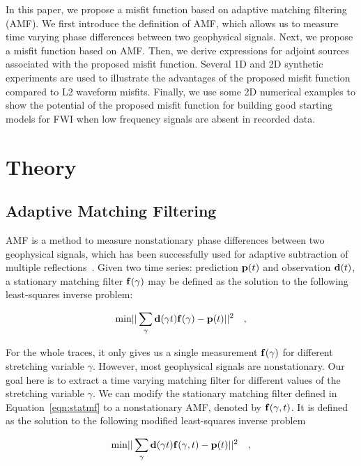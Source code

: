 In this paper, we propose a misfit function based on adaptive matching filtering (AMF). 
We first introduce the definition of AMF, which allows us to measure 
time varying phase differences between two geophysical signals. 
Next, we propose a misfit function based on AMF. Then, we derive expressions for adjoint sources 
associated with the proposed misfit function. Several 1D and 2D synthetic experiments are used 
to illustrate the advantages of the proposed misfit function compared to L2 waveform misfits. 
Finally, we use some 2D numerical examples to show the potential of 
the proposed misfit function for building good starting models for FWI when low frequency signals 
are absent in recorded data.

\section{Theory} 
\subsection{Adaptive Matching Filtering} \label{sec:amf}
AMF is a method to measure nonstationary phase differences between two geophysical signals, 
which has been successfully used for adaptive subtraction of multiple reflections~\citep{nonstationary2009}. 
Given two time series: prediction ${\bf p}(t)$ 
and observation ${\bf d}(t)$,
a stationary matching filter ${\bf f}(\gamma)$ may be defined as the solution to
the following least-squares inverse problem: 

\begin{equation}
\label{eqn:statmf}
{\rm min} ||\sum_{\gamma} {\bf d}(\gamma t) {\bf f}(\gamma)-{\bf p}(t)||^2 
\quad ,
\end{equation}

For the whole traces, it only gives us a single measurement ${\bf f}(\gamma)$ for different 
stretching variable $\gamma$. However, most geophysical signals are nonstationary. 
Our goal here is to extract a time varying matching filter for different values of the stretching variable $\gamma$. 
We can modify the stationary matching filter defined in Equation~\ref{eqn:statmf} to 
a nonstationary AMF, denoted by ${\bf f}(\gamma,t)$. It is defined as the solution to the following 
modified least-squares inverse problem

\begin{equation}
\label{eqn:nonstatmf}
{\rm min} ||\sum_{\gamma} {\bf d}(\gamma t) {\bf f}(\gamma,t)-{\bf p}(t)||^2
\quad ,
\end{equation}

